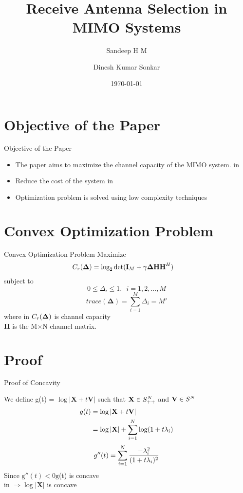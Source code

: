 \documentclass{beamer}
\title{Receive Antenna Selection in MIMO Systems}
\author{Sandeep H M \and Dinesh Kumar Sonkar}
\date{\today}
\begin{document}
\begin{frame}
  \titlepage
\end{frame}

\section{Objective of the Paper}
\begin{frame}{Objective of the Paper}
\begin{itemize}
    \item The paper aims to maximize the channel capacity of the MIMO system.
     in
    \item Reduce the cost of the system
     in
    \item Optimization problem is solved using low complexity techniques
\end{itemize}
\end{frame}

\section{Convex Optimization Problem}
\begin{frame}{Convex Optimization Problem}
Maximize 
\begin{align*}
\mathnormal{C}_r(\mathbf{\Delta}) &=\log_{2}\text{det}(\mathbf{I}_M + \gamma\mathbf{\Delta}\textbf{H}\textbf{H}^H)
\end{align*}
subject to
$$0\leq\Delta_{i}\leq1,\enspace i=1,2,...,M$$
$$trace(\mathbf{\Delta})=\sum_{i=1}^{M} \Delta_i = M'$$
where
 in
$\mathnormal{C}_r(\mathbf{\Delta})$ is channel capacity\\
\textbf{H} is the M$\times$N channel matrix.
\end{frame}

\section{Proof}
\begin{frame}{Proof of Concavity}

We define g(t) = $\log|\mathbf{X}+t\mathbf{V}|$ such that $\mathbf{X}\in\mathnormal{S}_{++}^N$ and $\mathbf{V}\in\mathnormal{S}^N$
\begin{align*}
g(t) &= \log |\mathbf{X}+t\mathbf{V}|\\
&= \log|\mathbf{X}|+\sum_{i=1}^{N}\log(1+t\mathnormal{\lambda}_i)\\
\end{align*}
$$g''(t) = \sum_{i=1}^{N}\frac{-\mathnormal{\lambda}_i^2}{(1+t\mathnormal{\lambda}_i)^2}$$
Since $\mathrm{g}''(t)< 0 \mathrm{g}$(t) is concave\\
 in
$\Rightarrow \log|\mathbf{X}|$ is concave 
\end{frame}
\end{document}

